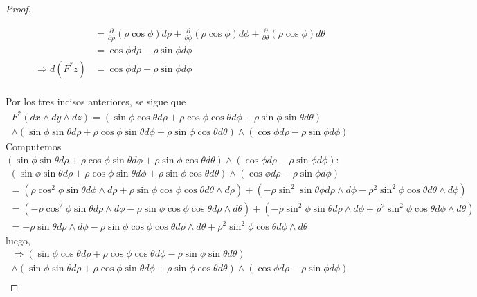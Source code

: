 \documentclass[12pt]{report}
\theoremstyle{largebreak}
\begin{document}
\begin{proof}
\begin{enumerate}
\begin{equation*}
\begin{split}
                    &=\frac{\partial}{\partial\rho}(\rho\cos\phi)d\rho+\frac{\partial}{\partial\phi}(\rho\cos\phi)d\phi+\frac{\partial}{\partial\theta}(\rho\cos\phi)d\theta\\
                    &=\cos\phi d\rho-\rho\sin\phi d\phi\\
                    \Rightarrow d(F^*z)&=\cos\phi d\rho-\rho\sin\phi d\phi\\
                \end{split}
            \end{equation*}
        \end{enumerate}
        Por los tres incisos anteriores, se sigue que
        \begin{multline*}
            F^*(dx\wedge dy\wedge dz)=(\sin\phi\cos\theta d\rho+\rho\cos\phi\cos\theta d\phi-\rho\sin\phi\sin\theta d\theta)\\ \wedge(\sin\phi\sin\theta d\rho+\rho\cos\phi\sin\theta d\phi+\rho\sin\phi\cos\theta d\theta) \wedge(\cos\phi d\rho-\rho\sin\phi d\phi)
        \end{multline*}
        Computemos $(\sin\phi\sin\theta d\rho+\rho\cos\phi\sin\theta d\phi+\rho\sin\phi\cos\theta d\theta)\wedge(\cos\phi d\rho-\rho\sin\phi d\phi)$:
        \begin{multline*}
            (\sin\phi\sin\theta d\rho+\rho\cos\phi\sin\theta d\phi+\rho\sin\phi\cos\theta d\theta)\wedge(\cos\phi d\rho-\rho\sin\phi d\phi)\\
            =(\rho\cos^2\phi\sin\theta d\phi\wedge d\rho+\rho \sin\phi\cos\phi\cos\theta d\theta\wedge d\rho)+(-\rho \sin^2\sin\theta\phi d\rho\wedge d\phi-\rho^2\sin^2\phi\cos\theta d\theta\wedge d\phi)\\
            =(-\rho\cos^2\phi\sin\theta d\rho\wedge d\phi-\rho \sin\phi\cos\phi\cos\theta d\rho\wedge d\theta)+(-\rho \sin^2\phi\sin\theta d\rho\wedge d\phi+\rho^2\sin^2\phi\cos\theta d\phi\wedge d\theta)\\
            =-\rho\sin\theta d\rho\wedge d\phi-\rho \sin\phi\cos\phi\cos\theta d\rho\wedge d\theta+\rho^2\sin^2\phi\cos\theta d\phi\wedge d\theta
        \end{multline*}
        luego,
        \begin{multline*}
            \Rightarrow(\sin\phi\cos\theta d\rho+\rho\cos\phi\cos\theta d\phi-\rho\sin\phi\sin\theta d\theta)\\ \wedge(\sin\phi\sin\theta d\rho+\rho\cos\phi\sin\theta d\phi+\rho\sin\phi\cos\theta d\theta) \wedge(\cos\phi d\rho-\rho\sin\phi d\phi)\\

\end{multline*}
\end{proof}
\end{document}

